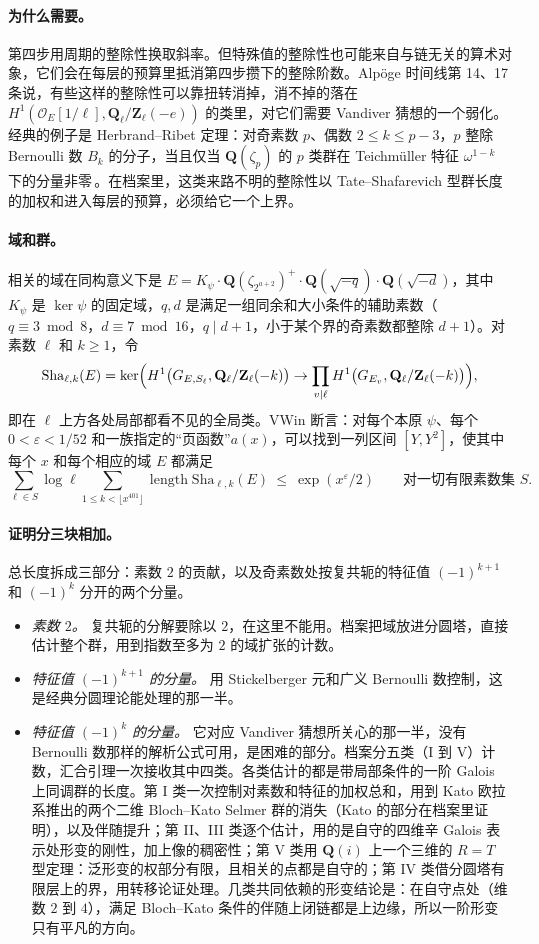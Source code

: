 \documentclass[11pt]{article}
\newcommand{\Q}{\mathbf{Q}}
\newcommand{\Z}{\mathbf{Z}}
\newcommand{\Sha}{\mathrm{Sha}}
\begin{document}
\paragraph{为什么需要。} 第四步用周期的整除性换取斜率。但特殊值的整除性也可能来自与链无关的算术对象，它们会在每层的预算里抵消第四步攒下的整除阶数。Alpöge 时间线第 14、17 条说，有些这样的整除性可以靠扭转消掉，消不掉的落在 $H^1(\mathcal O_E[1/\ell],\Q_\ell/\Z_\ell(-e))$ 的类里，对它们需要 Vandiver 猜想的一个弱化。经典的例子是 Herbrand–Ribet 定理：对奇素数 $p$、偶数 $2\le k\le p-3$，$p$ 整除 Bernoulli 数 $B_k$ 的分子，当且仅当 $\Q(\zeta_p)$ 的 $p$ 类群在 Teichmüller 特征 $\omega^{1-k}$ 下的分量非零\,\cite{herbrand,ribet}。在档案里，这类来路不明的整除性以 Tate–Shafarevich 型群长度的加权和进入每层的预算，必须给它一个上界。

\paragraph{域和群。} 相关的域在同构意义下是 $E=K_\psi\cdot\Q(\zeta_{2^{a+2}})^+\cdot\Q(\sqrt{-q})\cdot\Q(\sqrt{-d})$，其中 $K_\psi$ 是 $\ker\psi$ 的固定域，$q,d$ 是满足一组同余和大小条件的辅助素数（$q\equiv3\bmod8$，$d\equiv7\bmod16$，$q\mid d+1$，小于某个界的奇素数都整除 $d+1$）。对素数 $\ell$ 和 $k\ge1$，令
\[
\Sha_{\ell,k}(E)=\ker\Bigl(H^1\bigl(G_{E,S_\ell},\Q_\ell/\Z_\ell(-k)\bigr)\to\prod_{v\mid\ell}H^1\bigl(G_{E_v},\Q_\ell/\Z_\ell(-k)\bigr)\Bigr),
\]
即在 $\ell$ 上方各处局部都看不见的全局类。\textsf{VWin} 断言：对每个本原 $\psi$、每个 $0<\varepsilon<1/52$ 和一族指定的“页函数”$a(x)$，可以找到一列区间 $[Y,Y^2]$，使其中每个 $x$ 和每个相应的域 $E$ 都满足
\[
\sum_{\ell\in S}\log\ell\sum_{1\le k<\lfloor x^{401}\rfloor}\operatorname{length}\Sha_{\ell,k}(E)\ \le\ \exp(x^{\varepsilon}/2)\qquad\text{对一切有限素数集 } S .
\]

\paragraph{证明分三块相加。} 总长度拆成三部分：素数 $2$ 的贡献，以及奇素数处按复共轭的特征值 $(-1)^{k+1}$ 和 $(-1)^k$ 分开的两个分量。
\begin{itemize}
\item \emph{素数 $2$。} 复共轭的分解要除以 $2$，在这里不能用。档案把域放进分圆塔，直接估计整个群，用到指数至多为 $2$ 的域扩张的计数。
\item \emph{特征值 $(-1)^{k+1}$ 的分量。} 用 Stickelberger 元和广义 Bernoulli 数控制，这是经典分圆理论能处理的那一半。
\item \emph{特征值 $(-1)^k$ 的分量。} 它对应 Vandiver 猜想所关心的那一半，没有 Bernoulli 数那样的解析公式可用，是困难的部分。档案分五类（I 到 V）计数，汇合引理一次接收其中四类。各类估计的都是带局部条件的一阶 Galois 上同调群的长度。第 I 类一次控制对素数和特征的加权总和，用到 Kato 欧拉系推出的两个二维 Bloch–Kato Selmer 群的消失（Kato 的部分在档案里证明），以及伴随提升；第 II、III 类逐个估计，用的是自守的四维辛 Galois 表示处形变的刚性，加上像的稠密性；第 V 类用 $\Q(i)$ 上一个三维的 $R=T$ 型定理：泛形变的权部分有限，且相关的点都是自守的；第 IV 类借分圆塔有限层上的界，用转移论证处理。几类共同依赖的形变结论是：在自守点处（维数 $2$ 到 $4$），满足 Bloch–Kato 条件的伴随上闭链都是上边缘，所以一阶形变只有平凡的方向。
\end{itemize}
\end{document}
